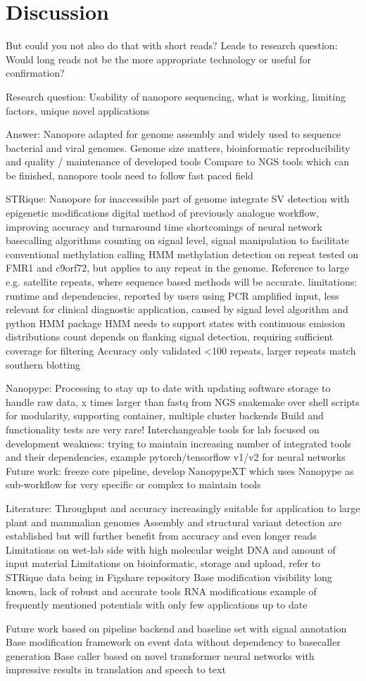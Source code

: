 \chapter{Discussion}
\label{cha:summary}

But could you not also do that with short reads?
Leads to research question:
Would long reads not be the more appropriate technology or useful for confirmation?

Research question: Usability of nanopore sequencing, what is working, limiting factors, unique novel applications

Answer: Nanopore adapted for genome assembly and widely used to sequence bacterial and viral genomes.
Genome size matters, bioinformatic reproducibility and quality / maintenance of developed tools
Compare to NGS tools which can be finished, nanopore tools need to follow fast paced field


STRique: Nanopore for inaccessible part of genome
integrate SV detection with epigenetic modifications
digital method of previously analogue workflow, improving accuracy and turnaround time
shortcomings of neural network basecalling algorithms
counting on signal level, signal manipulation to facilitate conventional methylation calling
HMM methylation detection on repeat
tested on FMR1 and c9orf72, but applies to any repeat in the genome.
Reference to large e.g. satellite repeats, where sequence based methods will be accurate.
limitations: runtime and dependencies, reported by users using PCR amplified input, less relevant for clinical diagnostic application, caused by signal level algorithm and python HMM package
HMM needs to support states with continuous emission distributions 
count depends on flanking signal detection, requiring sufficient coverage for filtering
Accuracy only validated <100 repeats, larger repeats match southern blotting

Nanopype: Processing to stay up to date with updating software
storage to handle raw data, x times larger than fastq from NGS
snakemake over shell scripts for modularity, supporting container, multiple cluster backends
Build and functionality tests are very rare!
Interchangeable tools for lab focused on development
weakness: trying to maintain increasing number of integrated tools and their dependencies, example pytorch/tensorflow v1/v2 for neural networks
Future work: freeze core pipeline, develop NanopypeXT which uses Nanopype as sub-workflow for very specific or complex to maintain tools

Literature: Throughput and accuracy increasingly suitable for application to large plant and mammalian genomes
Assembly and structural variant detection are established but will further benefit from accuracy and even longer reads
Limitations on wet-lab side with high molecular weight DNA and amount of input material
Limitations on bioinformatic, storage and upload, refer to STRique data being in Figshare repository
Base modification visibility long known, lack of robust and accurate tools
RNA modifications example of frequently mentioned potentials with only few applications up to date

Future work based on pipeline backend and baseline set with signal annotation
Base modification framework on event data without dependency to basecaller generation
Base caller based on novel transformer neural networks with impressive results in translation and speech to text







